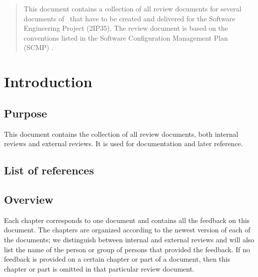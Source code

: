 \documentclass[%
		pathtobase=..,%
		titlefull={Review Document},%
		titleabbr=Review,%
		version=0.15]{fingerpaint}
\begin{document}
\maketitle{}

\begin{abstract}
This document contains a collection of all review documents for several documents of \projectname\ that have to be created and delivered for the Software Engineering Project (2IP35). The review document is based on the conventions listed in the Software Configuration Management Plan (SCMP) \cite{scmp}.
\end{abstract}

\tableofcontents



\chapter{Introduction}
\section{Purpose}
This document contains the collection of all review documents, both internal reviews and external reviews. It is used for documentation and later reference.

\section{List of references}


\section{Overview}
Each chapter corresponds to one document and contains all the feedback on this document. The chapters are organized according to the newest version of each of the documents; we distinguish between internal and external reviews and will also list the name of the person or group of persons that provided the feedback. If no feedback is provided on a certain chapter or part of a document, then this chapter or part is omitted in that particular review document.
\end{document}
